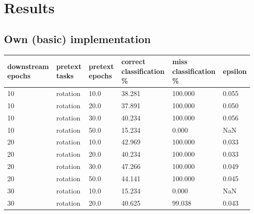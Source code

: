 \newpage


\section{Results}

\subsection{Own (basic) implementation}

\begin{longtable}{|| p{} | p{} | p{} | p{} | p{} | p{} ||}
    \hline \hline
    downstream epochs & pretext tasks     & pretext epochs & correct classification \% & miss classification \% & epsilon\\
    \hline \hline
    10                & rotation          & 10.0           & 38.281                    & 100.000                & 0.055   \\ \hline
    10                & rotation          & 20.0           & 37.891                    & 100.000                & 0.050   \\ \hline
    \rowcolor{yellow}
    10                & rotation          & 30.0           & 40.234                    & 100.000                & 0.056   \\ \hline
    10                & rotation          & 50.0           & 15.234                    & 0.000                  & NaN     \\ \hline
    20                & rotation          & 10.0           & 42.969                    & 100.000                & 0.033   \\ \hline
    20                & rotation          & 20.0           & 40.234                    & 100.000                & 0.033   \\ \hline
    20                & rotation          & 30.0           & 47.266                    & 100.000                & 0.049   \\ \hline
    20                & rotation          & 50.0           & 44.141                    & 100.000                & 0.045   \\ \hline
    30                & rotation          & 10.0           & 15.234                    & 0.000                  & NaN     \\ \hline
    30                & rotation          & 20.0           & 40.625                    & 99.038                 & 0.043   \\ \hline

\end{longtable}
